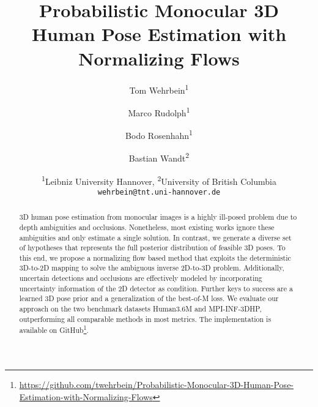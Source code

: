 \documentclass[10pt,twocolumn,letterpaper]{article}
\begin{document}
\title{Probabilistic Monocular 3D Human Pose Estimation with Normalizing Flows}

\author{Tom Wehrbein\textsuperscript{1}
\and
Marco Rudolph\textsuperscript{1}
\and
Bodo Rosenhahn\textsuperscript{1}
\and
Bastian Wandt\textsuperscript{2}
\and
\textsuperscript{1}Leibniz University Hannover, \textsuperscript{2}University of British Columbia\\
{\tt\small wehrbein@tnt.uni-hannover.de}
}

\maketitle




\renewcommand{\footnotesize}{\fontsize{7.4pt}{9pt}\selectfont}
\begin{abstract}
3D human pose estimation from monocular images is a highly ill-posed problem due to depth ambiguities and occlusions.
Nonetheless, most existing works ignore these ambiguities and only estimate a single solution.
In contrast, we generate a diverse set of hypotheses that represents the full posterior distribution of feasible 3D poses.
To this end, we propose a normalizing flow based method that exploits the
deterministic 3D-to-2D mapping to solve the ambiguous inverse 2D-to-3D problem. 
Additionally, uncertain detections and occlusions are effectively modeled by incorporating uncertainty information of the 2D detector as condition.
Further keys to success are a learned 3D pose prior and a generalization of the best-of-M loss.
We evaluate our approach on the two benchmark datasets Human3.6M and MPI-INF-3DHP, outperforming all comparable methods in most metrics. The implementation is available on GitHub\footnote{\url{https://github.com/twehrbein/Probabilistic-Monocular-3D-Human-Pose-Estimation-with-Normalizing-Flows}}.

\end{abstract}

\renewcommand{\footnotesize}{\fontsize{8pt}{9pt}\selectfont}
\end{document}
